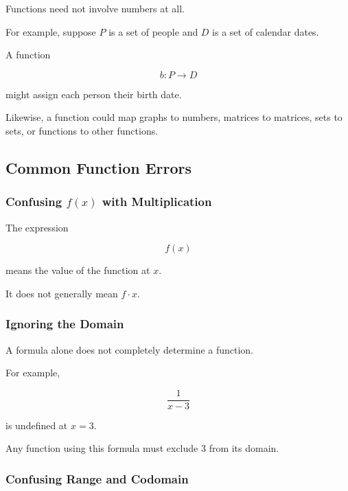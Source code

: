 Functions need not involve numbers at all.

For example, suppose \(P\) is a set of people and \(D\) is a set of calendar
dates.

A function

\[ b:P\to D \]

might assign each person their birth date.

Likewise, a function could map graphs to numbers, matrices to matrices, sets
to sets, or functions to other functions.

\subsection{Common Function Errors}
\label{subsec:common-function-errors}

\subsubsection{Confusing \(f(x)\) with Multiplication}

The expression

\[ f(x) \]

means the value of the function at \(x\).

It does not generally mean \(f\cdot x\).

\subsubsection{Ignoring the Domain}
\label{subsec:function-error-domain}

A formula alone does not completely determine a function.

For example,

\[ \frac1{x-3} \]

is undefined at \(x=3\).

Any function using this formula must exclude \(3\) from its domain.

\subsubsection{Confusing Range and Codomain}
\label{subsec:function-error-range-codomain}


